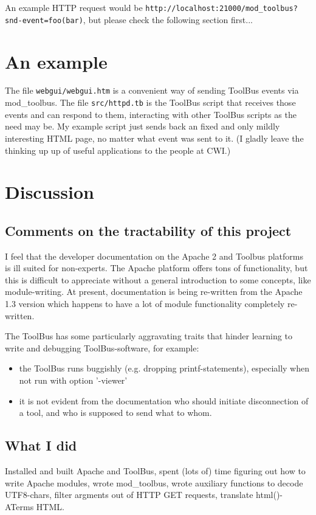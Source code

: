 \documentclass[a4paper,10pt]{article}
\begin{document}
An example HTTP request would be  \texttt{http://localhost:21000/mod\_toolbus?snd-event=foo(bar)}, but please check the following section first...

\section{An example}
The file \texttt{webgui/webgui.htm} is a convenient way of sending ToolBus events via mod\_toolbus. The file \texttt{src/httpd.tb} is the ToolBus script that receives those events and can respond to them, interacting with other ToolBus scripts as the need may be. My example script just sends back an fixed and only mildly interesting HTML page, no matter what event was sent to it. (I gladly leave the thinking up up of useful applications to the people at CWI.)



\section{Discussion}
\subsection{Comments on the tractability of this project}
I feel that the developer documentation on the Apache 2 and Toolbus platforms is ill suited for non-experts. The Apache platform offers tons of functionality, but this is difficult to appreciate without a general introduction to some concepts, like module-writing. At present, documentation is being re-written from the Apache 1.3 version which happens to have a lot of module functionality completely re-written.

The ToolBus has some particularly aggravating traits that hinder learning to write and debugging ToolBus-software, for example:

\begin{itemize}
\item the ToolBus runs buggishly (e.g. dropping printf-statements), especially when not run with option '-viewer'
\item it is not evident from the documentation who should initiate disconnection of a tool, and who is supposed to send what to whom.
\end{itemize} 

\subsection{What I did}
Installed and built Apache and ToolBus, spent (lots of) time figuring out how to write Apache modules, wrote mod\_toolbus, wrote auxiliary functions to decode UTF8-chars, filter argments out of HTTP GET requests, translate html()-ATerms HTML.
\end{document}
